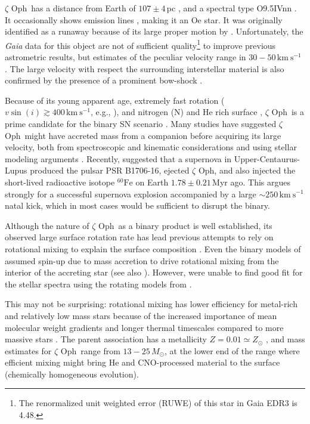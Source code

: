 \documentclass[twocolumn,twocolappendix,trackchanges]{aastex63}
\newcommand{\kms}{{\mathrm{km\ s^{-1}}}}
\newcommand{\zoph}{$\zeta$ Oph}
\begin{document}
\zoph\ has a distance from Earth of $107\pm4$\,pc \citep[][and
references therein]{neuhauser:20}, and a spectral type O9.5{\rm IVnn}
\citep{sota:14}. It occasionally shows emission lines
\citep{walker:79, vink:09}, making it an Oe star. It was originally
identified as a runaway because of its large proper motion by
\cite{blaauw:52}. Unfortunately, the \emph{Gaia} data for this object
are not of sufficient quality\footnote{The renormalized unit weighted
  error (RUWE) of this star in Gaia EDR3 is 4.48.} to improve previous astrometric results,
but estimates of the peculiar velocity range in $30-50\,\kms$
\citep[e.g.,][]{zehe:18, neuhauser:20}. The large velocity with
respect the surrounding interstellar material is also confirmed by the
presence of a prominent bow-shock \citep[e.g.,][]{bodensteiner:18}.

Because of its young apparent age, extremely fast rotation
($v\sin(i)\gtrsim 400\,\kms$, e.g., \citealt{zehe:18}), and nitrogen
(N) and He rich surface \citep[e.g.,][]{herrero:92, blaauw:93,
  villamariz:05, marcolino:09}, \zoph\ is a prime candidate for the
binary SN scenario \citep{blaauw:93}. Many studies have
suggested \zoph\ might have accreted mass from a companion before
acquiring its large velocity, both from spectroscopic and kinematic
considerations \citep[e.g.,][]{blaauw:93, hoogerwerf:00,
  hoogerwerf:01, tetzlaff:10, neuhauser:20} and using stellar modeling
arguments \citep[e.g.,][]{vanrensbergen:96}. Recently,
\cite{neuhauser:20} suggested that a supernova in
Upper-Centaurus-Lupus produced the pulsar PSR B1706-16, ejected \zoph,
and also injected the short-lived radioactive isotope
$^{60}\mathrm{Fe}$ on Earth $1.78\pm0.21$\,Myr ago. This argues
strongly for a successful supernova explosion accompanied by a large
$\sim 250\,\kms$ natal kick, which in most cases would be sufficient
to disrupt the binary.

Although the nature of \zoph\ as a binary product is well established,
its observed large surface rotation rate has lead previous attempts to
rely on rotational mixing to explain the surface composition
\cite[e.g.,][]{maeder:00}. Even the binary models of
\cite{vanrensbergen:96} assumed spin-up due to mass accretion to drive
rotational mixing from the interior of the accreting star (see also
\citealt{cantiello:07}). However, \cite{villamariz:05} were unable to
find good fit for the stellar spectra using the rotating models from
\cite{meynet:00}.

This may not be surprising: rotational mixing has lower efficiency for
metal-rich and relatively low mass stars because of the increased
importance of mean molecular weight gradients and longer thermal
timescales compared to more massive stars \citep[e.g.,][]{yoon:06,
  perna:14}. The parent association has a metallicity $Z=0.01\simeq Z_\odot$
\citep[based on asteroseismology from][]{murphy:21}, and mass estimates for \zoph\ range from
$13-25\,M_\odot$, at the lower end of the range where efficient mixing
might bring He and CNO-processed material to the surface (chemically
homogeneous evolution).
\end{document}
